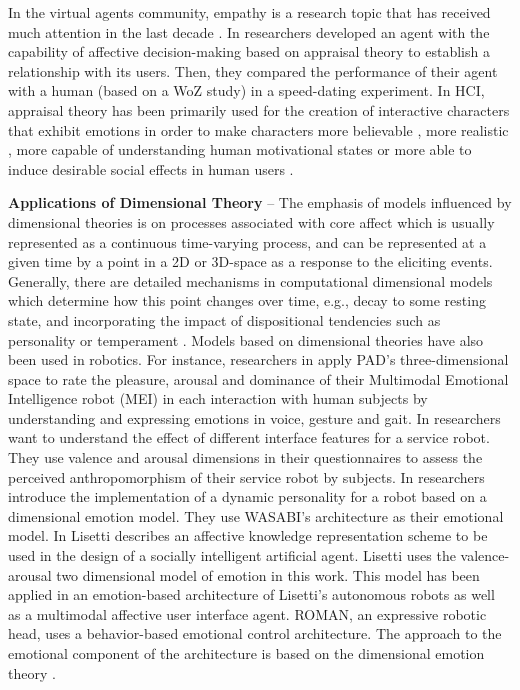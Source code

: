 \documentclass[12pt]{report}
\begin{document}
In the virtual agents community, empathy is a research topic that has received
much attention in the last decade \cite{brave:emotion-hci}
\cite{scott:modeling-empathy-agent} \cite{paiva:agent-care}
\cite{prendinger:empathic-companion} \cite{bickmore:longterm-relationship}. In
\cite{pontier:women-robot-men} researchers developed an agent with the
capability of affective decision-making based on appraisal theory to establish a
relationship with its users. Then, they compared the performance of their agent
with a human (based on a WoZ study) in a speed-dating experiment. In HCI,
appraisal theory has been primarily used for the creation of interactive
characters that exhibit emotions in order to make characters more believable
\cite{neal:believable-agents}, more realistic \cite{mao:social-causality}
\cite{traum:negotiation-teams-training}, more capable of understanding human
motivational states \cite{conati:evaluating-student-affect} or more able to
induce desirable social effects in human users \cite{paiva:learning-feeling}.

\textbf{Applications of Dimensional Theory} -- The emphasis of models influenced
by dimensional theories is on processes associated with core affect which is
usually represented as a continuous time-varying process, and can be represented
at a given time by a point in a 2D or 3D-space as a response to the eliciting
events. Generally, there are detailed mechanisms in computational dimensional
models which determine how this point changes over time, e.g., decay to some
resting state, and incorporating the impact of dispositional tendencies such as
personality or temperament \cite{gebhard:alma}
\cite{marsella:computational-models}. Models based on dimensional theories have
also been used in robotics. For instance, researchers in
\cite{lim:mei-motherese-ei} apply PAD's three-dimensional space to rate the
pleasure, arousal and dominance of their Multimodal Emotional Intelligence robot
(MEI) in each interaction with human subjects by understanding and expressing
emotions in voice, gesture and gait. In \cite{zhang:service-robot-dimensional}
researchers want to understand the effect of different interface features for a
service robot. They use valence and arousal dimensions in their questionnaires
to assess the perceived anthropomorphism of their service robot by subjects. In
\cite{klug:emotion-based-hri} researchers introduce the implementation of a
dynamic personality for a robot based on a dimensional emotion model. They use
WASABI's architecture \cite{becker:wasabi,becker:wasabi-description} as their
emotional model. In \cite{lisetti:affect-socially-intelligent} Lisetti describes
an affective knowledge representation scheme to be used in the design of a
socially intelligent artificial agent. Lisetti uses the valence-arousal two
dimensional model of emotion in this work. This model has been applied in an
emotion-based architecture of Lisetti's autonomous robots as well as a
multimodal affective user interface agent. ROMAN, an expressive robotic head,
uses a behavior-based emotional control architecture. The approach to the
emotional component of the architecture is based on the dimensional emotion
theory \cite{hirth:roman}.
\end{document}
